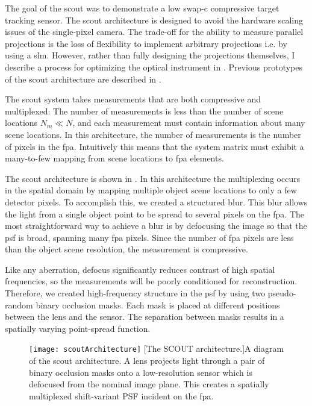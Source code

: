 The goal of the \gls{scout} was to demonstrate a low \gls{swap-c} compressive target tracking sensor. The \gls{scout} architecture is designed to avoid the hardware scaling issues of the single-pixel camera. The trade-off for the ability to measure parallel projections is the loss of flexibility to implement arbitrary projections i.e. by using a \gls{slm}. However, rather than fully designing the projections themselves, I describe a process for optimizing the optical instrument  in . Previous prototypes of the \gls{scout} architecture are described in \cite{stenner2010static, rivenson2010single}. 

The \gls{scout} system takes measurements that are both compressive and multiplexed: The number of measurements is less than the number of scene locations $N_m \ll N$, and each measurement must contain information about many scene locations. In this architecture, the number of measurements is the number of pixels in the \gls{fpa}. Intuitively this means that the system matrix must exhibit a many-to-few mapping from scene locations to \gls{fpa} elements. 


The \gls{scout} architecture is shown in . In this architecture the \gls{multiplexing} occurs in the spatial domain by mapping multiple object scene locations to only a few detector pixels. To accomplish this, we created a structured blur. This blur allows the light from a single object point to be spread to several pixels on the \gls{fpa}. The most straightforward way to achieve a blur is by defocusing the image so that the \gls{psf} is broad, spanning many \gls{fpa} pixels. Since the number of \gls{fpa} pixels are less than the object scene resolution, the measurement is compressive. 


Like any aberration, defocus significantly reduces contrast of high spatial frequencies, so the measurements will be poorly conditioned for reconstruction. Therefore, we created high-frequency structure in the \gls{psf} by using two pseudo-random binary occlusion masks. Each mask is placed at different positions between the lens and the sensor. The separation between masks results in a spatially varying point-spread function. 




\begin{figure}
	\texttt{[image: scoutArchitecture]}
	[The SCOUT architecture.]{A diagram of the \gls{scout} architecture. A lens projects light through a pair of binary occlusion masks onto a low-resolution sensor which is defocused from the nominal image plane. This creates a spatially multiplexed shift-variant PSF incident on the \gls{fpa}.  }
	\label{fig:scoutArchitecture}
\end{figure}




